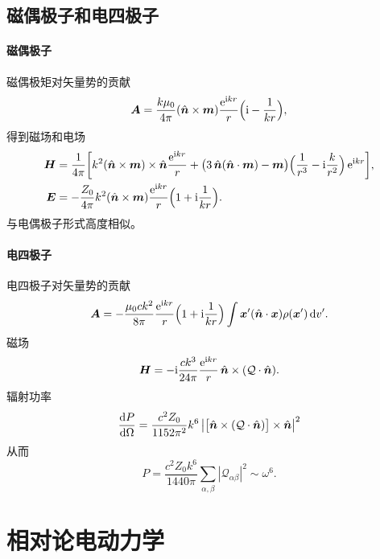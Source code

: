 \subsection{磁偶极子和电四极子}
\paragraph{磁偶极子}
磁偶极矩对矢量势的贡献
\[
    \bm A=\frac{k\mu_0}{4\pi}(\mathop{}\!\hat{\bm n}\times\bm m)\frac{\mathop{}\!\mathrm{e}^{\mathrm{i} kr}}r\Bigl(\mathrm{i}-\frac1{kr}\Bigr),
\]
得到磁场和电场
\begin{align*}
    \bm H&=\frac1{4\pi}\biggfkh{k^2(\uvec n\times\bm m)\times\uvec n\frac{\e{\i kr}}r+\bigkh{3\uvec n(\uvec n\cdot\bm m)-\bm m}\Bigkh{\frac1{r^3}-\i\frac{k}{r^2}}\e{\i kr}},\\
    \bm E&=-\frac{Z_0}{4\pi}k^2(\uvec n\times\bm m)\frac{\e{\i kr}}r\Bigkh{1+\i\frac1{ kr}}.
\end{align*}
与电偶极子形式高度相似。
\paragraph{电四极子}
电四极子对矢量势的贡献
\[
    \bm A=-\frac{\mu_0ck^2}{8\pi}\frac{\mathop{}\!\mathrm{e}^{\mathrm{i} kr}}r\Bigl(1+\mathrm{i}\frac1{kr}\Bigr)\int\bm x'(\mathop{}\!\hat{\bm n}\cdot\bm x)\rho(\bm x')\mathop{}\!\mathrm{d} v'.
\]
磁场
\[
    \bm H=-\mathrm{i}\frac{ck^3}{24\pi}\frac{\mathop{}\!\mathrm{e}^{\mathrm{i} kr}}r\mathop{}\!\hat{\bm n}\times(\mathcal Q\cdot\mathop{}\!\hat{\bm n}).
\]
辐射功率 
\[
    \frac{\mathrm{d}^{\;\!\!}P}{\mathrm{d} \Omega^{\;\!\!}}=\frac{c^2Z_0}{1152\pi^2}k^6\left\lvert\bigl[\mathop{}\!\hat{\bm n}\times(\mathcal Q\cdot\mathop{}\!\hat{\bm n})\bigr]\times\mathop{}\!\hat{\bm n}\right\rvert^2
\]
从而 
\[
    P=\frac{c^2Z_0k^6}{1440\pi}\sum_{\alpha,\beta}|\mathcal Q_{\alpha\beta}|^2\sim\omega^6.
\]

\clearpage
\section{相对论电动力学}
\label{sec:relativistic electromagnetic}
